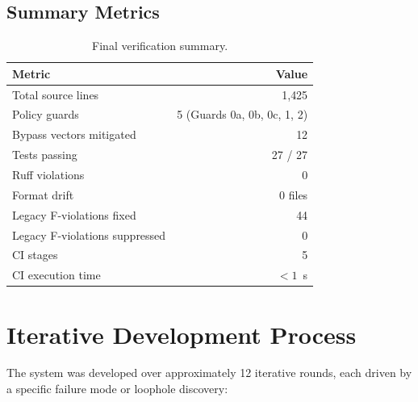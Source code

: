 \documentclass[11pt,a4paper]{article}
\begin{document}
\subsection{Summary Metrics}

\begin{table}[H]
\centering
\caption{Final verification summary.}
\label{tab:summary}
\begin{tabular}{@{}lr@{}}
\toprule
\textbf{Metric} & \textbf{Value} \\
\midrule
Total source lines             & 1{,}425 \\
Policy guards                  & 5 (Guards 0a, 0b, 0c, 1, 2) \\
Bypass vectors mitigated       & 12 \\
Tests passing                  & 27 / 27 \\
Ruff violations                & 0 \\
Format drift                   & 0 files \\
Legacy F-violations fixed      & 44 \\
Legacy F-violations suppressed & 0 \\
CI stages                      & 5 \\
CI execution time              & $< 1$~s \\
\bottomrule
\end{tabular}
\end{table}

\section{Iterative Development Process}
\label{sec:process}

The system was developed over approximately 12 iterative rounds, each driven
by a specific failure mode or loophole discovery:
\end{document}
